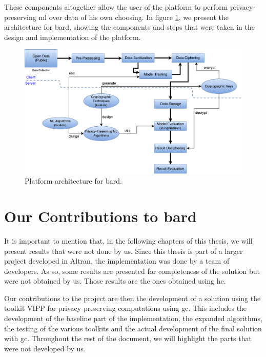 These components altogether allow the user of the platform to perform privacy-preserving \ac{ml} over data of his own choosing.
In figure \ref{fig:bard-architecture}, we present the architecture for \ac{bard}, showing the components and steps that were taken in the design and implementation of the platform.

\begin{figure}[H]
\centering
\label{fig:bard-architecture}
\includegraphics[width=1\textwidth]{images/BARDArchitecture.pdf}
\caption{Platform architecture for \acs{bard}.}
\end{figure}

\section{Our Contributions to \acs{bard}}
\label{sec:MyContributions}

It is important to mention that, in the following chapters of this thesis, we will present results that were not done by us. Since this thesis is part of a larger project developed in Altran, the implementation was done by a team of developers. As so, some results are presented for completeness of the solution but were not obtained by us. Those results are the ones obtained using \ac{he}.

Our contributions to the project are then the development of a solution using the toolkit VIPP for privacy-preserving computations using \ac{gc}. This includes the development of the baseline part of the implementation, the expanded algorithms, the testing of the various toolkits and the actual development of the final solution with \ac{gc}. Throughout the rest of the document, we will highlight the parts that were not developed by us. 

